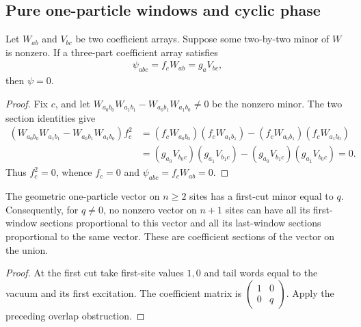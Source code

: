 

\subsection{Pure one-particle windows and cyclic phase}

\begin{lemma}
    \label{lem:overlapping_one_dimensional_windows_zero}
    \leanok
    Let $W_{ab}$ and $V_{bc}$ be two coefficient arrays. Suppose some
    two-by-two minor of $W$ is nonzero. If a three-part coefficient
    array satisfies
    \begin{align}
        \psi_{abc}=f_cW_{ab}=g_aV_{bc},
    \end{align}
    then $\psi=0$.
\end{lemma}
\begin{proof}
    \leanok
    Fix $c$, and let $W_{a_0b_0}W_{a_1b_1}-W_{a_0b_1}W_{a_1b_0}\ne0$ be the
    nonzero minor. The two section identities give
    \begin{align}
        (W_{a_0b_0}W_{a_1b_1}-W_{a_0b_1}W_{a_1b_0})f_c^2
         & =(f_cW_{a_0b_0})(f_cW_{a_1b_1})-(f_cW_{a_0b_1})(f_cW_{a_1b_0})         \\
         & =(g_{a_0}V_{b_0c})(g_{a_1}V_{b_1c})-(g_{a_0}V_{b_1c})(g_{a_1}V_{b_0c})
        =0.
    \end{align}
    Thus $f_c^2=0$, whence $f_c=0$ and $\psi_{abc}=f_cW_{ab}=0$.
\end{proof}

\begin{lemma}
    \label{lem:pvbs_pure_window_overlap_zero}
    \leanok
    The geometric one-particle vector on $n\ge2$ sites has a first-cut
    minor equal to $q$. Consequently, for $q\ne0$, no nonzero vector on
    $n+1$ sites can have all its first-window sections proportional to
    this vector and all its last-window sections proportional to the
    same vector. These are coefficient sections of the vector
    on the union.
\end{lemma}
\begin{proof}
    \leanok
    At the first cut take first-site values $1,0$ and tail words equal
    to the vacuum and its first excitation. The coefficient matrix is
    $\left(\begin{smallmatrix}1&0\\0&q\end{smallmatrix}\right)$.
    Apply the preceding overlap obstruction.
\end{proof}

